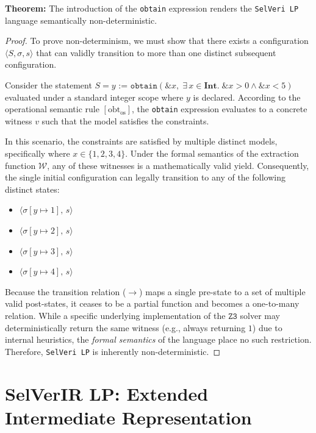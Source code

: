 \documentclass{article}
\begin{document}
\textbf{Theorem:} The introduction of the \texttt{obtain} expression renders the \texttt{SelVeri LP} language semantically non-deterministic.

\begin{proof}
To prove non-determinism, we must show that there exists a configuration $\langle S, \sigma, s \rangle$ that can validly transition to more than one distinct subsequent configuration.

Consider the statement $S = y \texttt{ := } \mathtt{obtain}(\texttt{\&}x,\; \exists\, x \in \textbf{Int}.\; \texttt{\&}x > 0 \land \texttt{\&}x < 5)$ evaluated under a standard integer scope where $y$ is declared. According to the operational semantic rule $[\text{obt}_{\text{os}}]$, the \texttt{obtain} expression evaluates to a concrete witness $v$ such that the model satisfies the constraints.

In this scenario, the constraints are satisfied by multiple distinct models, specifically where $x \in \{1, 2, 3, 4\}$. Under the formal semantics of the extraction function $\mathcal{W}$, any of these witnesses is a mathematically valid yield. Consequently, the single initial configuration can legally transition to any of the following distinct states:
\begin{itemize}
    \item $\langle \sigma[y \mapsto 1],\, s \rangle$
    \item $\langle \sigma[y \mapsto 2],\, s \rangle$
    \item $\langle \sigma[y \mapsto 3],\, s \rangle$
    \item $\langle \sigma[y \mapsto 4],\, s \rangle$
\end{itemize}

Because the transition relation ($\rightarrow$) maps a single pre-state to a set of multiple valid post-states, it ceases to be a partial function and becomes a one-to-many relation. While a specific underlying implementation of the $\mathtt{Z3}$ solver may deterministically return the same witness (e.g., always returning $1$) due to internal heuristics, the \textit{formal semantics} of the language place no such restriction. Therefore, \texttt{SelVeri LP} is inherently non-deterministic.
\end{proof}

\newpage
\section{SelVerIR LP: Extended Intermediate Representation}
\end{document}

